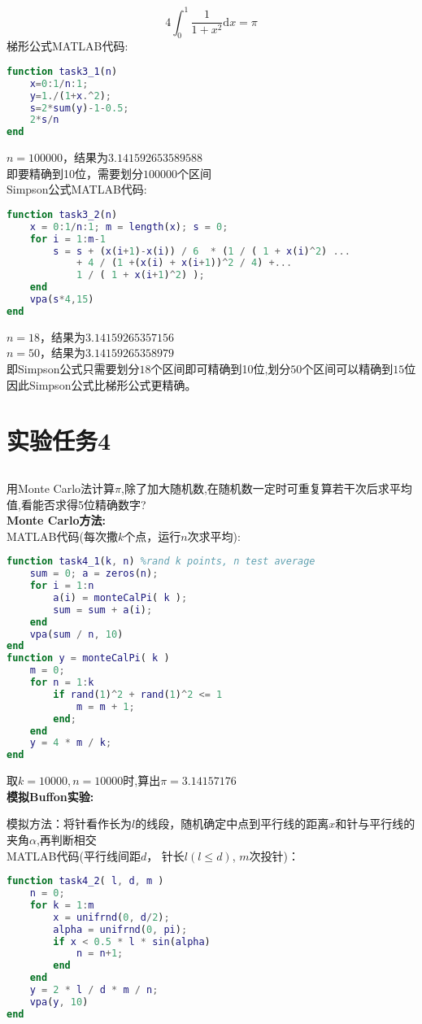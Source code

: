 \documentclass[12pt]{article}
\begin{document}
\begin{CJK*}{UTF8}{gbsn}
	$$4\int_0^1\dfrac{1}{1+x^2}\mathrm{d}x=\pi$$
	梯形公式MATLAB代码:
	\begin{lstlisting}[language=matlab]
function task3_1(n)
    x=0:1/n:1;
    y=1./(1+x.^2);
    s=2*sum(y)-1-0.5;
    2*s/n
end
	\end{lstlisting}
	$n=100000$，结果为$3.141592653589588$\\
	即要精确到10位，需要划分$100000$个区间\\
	Simpson公式MATLAB代码:
	\begin{lstlisting}[language=matlab]
function task3_2(n)
    x = 0:1/n:1; m = length(x); s = 0;
    for i = 1:m-1
        s = s + (x(i+1)-x(i)) / 6  * (1 / ( 1 + x(i)^2) ...
            + 4 / (1 +(x(i) + x(i+1))^2 / 4) +... 
            1 / ( 1 + x(i+1)^2) );
    end
    vpa(s*4,15)
end
	\end{lstlisting}
	$n=18$，结果为$3.14159265357156$\\
	$n=50$，结果为$3.14159265358979$\\
	即Simpson公式只需要划分$18$个区间即可精确到10位,划分$50$个区间可以精确到$15$位\\
	因此Simpson公式比梯形公式更精确。
\section{实验任务4}
	\subsection{}
	用Monte Carlo法计算$\pi$,除了加大随机数,在随机数一定时可重复算若干次后求平均值,看能否求得5位精确数字?\\
	
	\textbf{Monte Carlo方法:}\\
	
	MATLAB代码(每次撒$k$个点，运行$n$次求平均):
	\begin{lstlisting}[language=matlab]
function task4_1(k, n) %rand k points, n test average
    sum = 0; a = zeros(n);
    for i = 1:n
        a(i) = monteCalPi( k );
        sum = sum + a(i);
    end
    vpa(sum / n, 10)
end
function y = monteCalPi( k )
    m = 0;
    for n = 1:k
        if rand(1)^2 + rand(1)^2 <= 1
            m = m + 1;
        end;
    end
    y = 4 * m / k;
end
	\end{lstlisting}
	取$k=10000,n=10000$时,算出$\pi=3.14157176$\\
	
	\textbf{模拟Buffon实验:}
	
	模拟方法：将针看作长为$l$的线段，随机确定中点到平行线的距离$x$和针与平行线的夹角$\alpha$,再判断相交\\
	MATLAB代码(平行线间距$d$， 针长$l(l\leq d)$, $m$次投针)：
	\newpage
	\begin{lstlisting}[language=matlab]
function task4_2( l, d, m ) 
    n = 0;
    for k = 1:m
        x = unifrnd(0, d/2);
        alpha = unifrnd(0, pi);
        if x < 0.5 * l * sin(alpha)
            n = n+1;
        end
    end
    y = 2 * l / d * m / n;
    vpa(y, 10)
end
	\end{lstlisting}
	

\end{CJK*}
\end{document}
